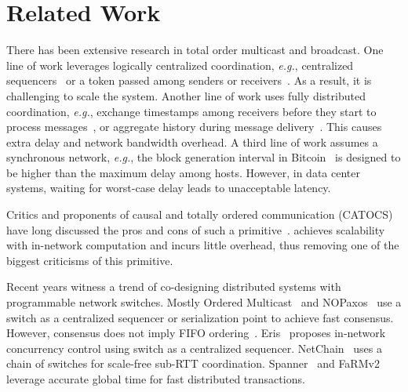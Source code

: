 \section{Related Work}
\label{sec:related}

There has been extensive research in total order multicast and broadcast.
One line of work leverages logically centralized coordination, \textit{e.g.}, centralized sequencers~\cite{eris} or a token passed among senders or receivers~\cite{rajagopalan1989token,kim1997total,ekwall2004token}.
As a result, it is challenging to scale the system.
Another line of work uses fully distributed coordination, \textit{e.g.}, exchange timestamps among receivers before they start to process messages~\cite{lamport1978time}, or aggregate history during message delivery~\cite{chandra1996unreliable}.
This causes extra delay and network bandwidth overhead.
A third line of work assumes a synchronous network, \textit{e.g.}, the block generation interval in Bitcoin~\cite{nakamoto2008bitcoin} is designed to be higher than the maximum delay among hosts.
However, in data center systems, waiting for worst-case delay leads to unacceptable latency.

Critics and proponents of causal and totally ordered communication (CATOCS) have long discussed the pros and cons of such a primitive~\cite{cheriton1994understanding,birman1994response,van1994bother}. 
\sys achieves scalability with in-network computation and incurs little overhead, thus removing one of the biggest criticisms of this primitive.

Recent years witness a trend of co-designing distributed systems with programmable network switches.
Mostly Ordered Multicast~\cite{ports2015designing} and NOPaxos~\cite{li2016just} use a switch as a centralized sequencer or serialization point to achieve fast consensus.
However, consensus does not imply FIFO ordering~\cite{junqueira2011zab}.
Eris~\cite{eris} proposes in-network concurrency control using switch as a centralized sequencer.
NetChain~\cite{jin2018netchain} uses a chain of switches for scale-free sub-RTT coordination.
Spanner~\cite{corbett2013spanner} and FaRMv2~\cite{shamis2020fast} leverage accurate global time for fast distributed transactions.

